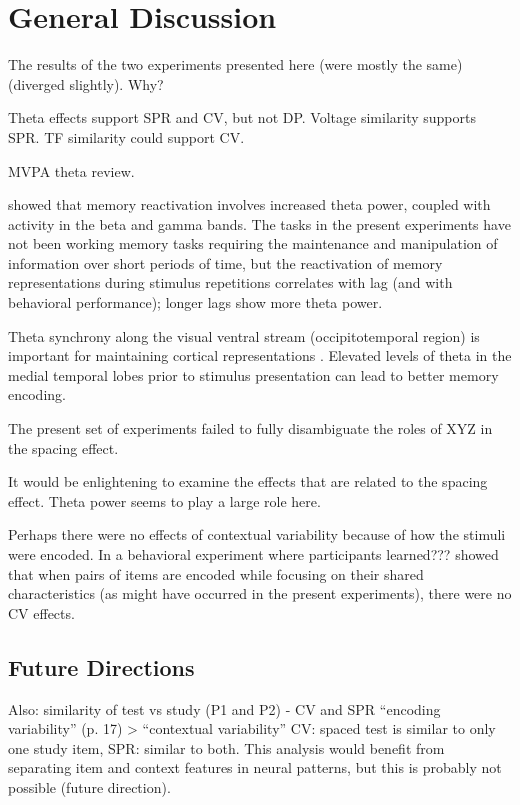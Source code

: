 
\section{General Discussion}

The results of the two experiments presented here (were mostly the same) (diverged slightly).  Why?


Theta effects support SPR and CV, but not DP.  Voltage similarity supports SPR.  TF similarity could support CV.

\cite{JafaEtal2013} MVPA theta review.

 showed that memory reactivation involves increased theta power, coupled with activity in the beta and gamma bands.
The tasks in the present experiments have not been working memory tasks requiring the maintenance and manipulation of information over short periods of time, but the reactivation of memory representations during stimulus repetitions correlates with lag (and with behavioral performance); longer lags show more theta power.

Theta synchrony along the visual ventral stream (occipitotemporal region) is important for maintaining cortical representations \cite{DuzeEtal2010}.  Elevated levels of theta in the medial temporal lobes prior to stimulus presentation can lead to better memory encoding.


The present set of experiments failed to fully disambiguate the roles of XYZ in the spacing effect.


It would be enlightening to examine the effects that are related to the spacing effect.  Theta power seems to play a large role here.


Perhaps there were no effects of contextual variability because of how the stimuli were encoded.  In a behavioral experiment where participants learned???  showed that when pairs of items are encoded while focusing on their shared characteristics (as might have occurred in the present experiments), there were no CV effects.

\subsection{Future Directions}


Also: similarity of test vs study (P1 and P2) - CV and SPR
``encoding variability''  (p. 17) > ``contextual variability''
CV: spaced test is similar to only one study item, SPR: similar to both.
This analysis would benefit from separating item and context features in neural patterns, but this is probably not possible (future direction).


